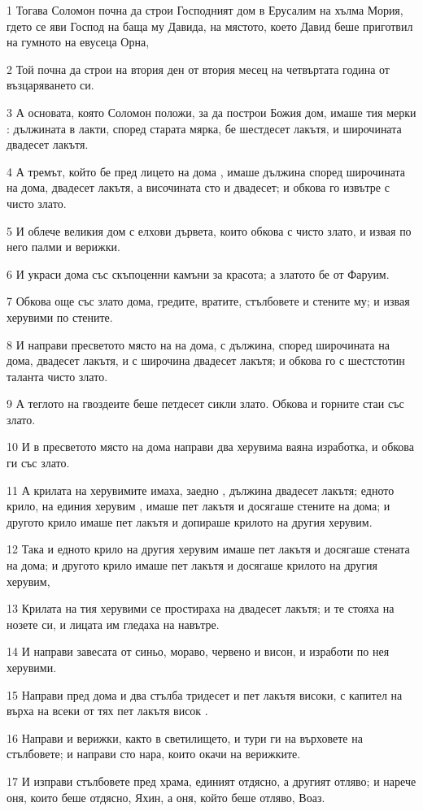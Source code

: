 \par 1 Тогава Соломон почна да строи Господният дом в Ерусалим на хълма Мория, гдето се яви Господ на баща му Давида, на мястото, което Давид беше приготвил на гумното на евусеца Орна,
\par 2 Той почна да строи на втория ден от втория месец на четвъртата година от възцаряването си.
\par 3 А основата, която Соломон положи, за да построи Божия дом, имаше тия мерки : дължината в лакти, според старата мярка, бе шестдесет лакътя, и широчината двадесет лакътя.
\par 4 А тремът, който бе пред лицето на дома , имаше дължина според широчината на дома, двадесет лакътя, а височината сто и двадесет; и обкова го извътре с чисто злато.
\par 5 И облече великия дом с елхови дървета, които обкова с чисто злато, и извая по него палми и верижки.
\par 6 И украси дома със скъпоценни камъни за красота; а златото бе от Фаруим.
\par 7 Обкова още със злато дома, гредите, вратите, стълбовете и стените му; и извая херувими по стените.
\par 8 И направи пресветото място на на дома, с дължина, според широчината на дома, двадесет лакътя, и с широчина двадесет лакътя; и обкова го с шестстотин таланта чисто злато.
\par 9 А теглото на гвоздеите беше петдесет сикли злато. Обкова и горните стаи със злато.
\par 10 И в пресветото място на дома направи два херувима ваяна изработка, и обкова ги със злато.
\par 11 А крилата на херувимите имаха, заедно , дължина двадесет лакътя; едното крило, на единия херувим , имаше пет лакътя и досягаше стените на дома; и другото крило имаше пет лакътя и допираше крилото на другия херувим.
\par 12 Така и едното крило на другия херувим имаше пет лакътя и досягаше стената на дома; и другото крило имаше пет лакътя и досягаше крилото на другия херувим,
\par 13 Крилата на тия херувими се простираха на двадесет лакътя; и те стояха на нозете си, и лицата им гледаха на навътре.
\par 14 И направи завесата от синьо, мораво, червено и висон, и изработи по нея херувими.
\par 15 Направи пред дома и два стълба тридесет и пет лакътя високи, с капител на върха на всеки от тях пет лакътя висок .
\par 16 Направи и верижки, както в светилището, и тури ги на върховете на стълбовете; и направи сто нара, които окачи на верижките.
\par 17 И изправи стълбовете пред храма, единият отдясно, а другият отляво; и нарече оня, които беше отдясно, Яхин, а оня, който беше отляво, Воаз.

